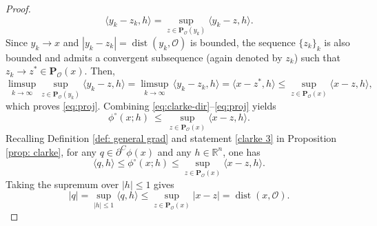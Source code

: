 \documentclass[12pt]{amsart}
\numberwithin{equation}{section}
\theoremstyle{plain}
\begin{document}
\begin{proof}
\begin{equation*}
    \langle y_k-z_k,h\rangle = \sup_{z\in \mathbf{P}_{\mathscr{O}}(y_k)}\langle y_k-z,h\rangle.
\end{equation*}
Since $y_k\to x$ and $ |y_k-z_k|=\operatorname{dist}(y_k,\mathscr{O})$ is bounded, the sequence $\{z_k\}_{k}$ is also bounded and admits a convergent subsequence (again denoted by $z_{k}$) such that $z_k\to z^*\in \mathbf{P}_{\mathscr{O}}(x)$. Then,
\begin{equation*}
    \limsup_{k\to\infty} \sup_{z\in \mathbf{P}_{\mathscr{O}}(y_k)}\langle y_k-z,h\rangle
    = \limsup_{k\to\infty} \, \langle y_k-z_k,h\rangle
    = \langle x-z^*,h\rangle
    \leq \sup_{z\in \mathbf{P}_{\mathscr{O}}(x)}\langle x-z,h\rangle,
\end{equation*}
which proves \eqref{eq:proj}. Combining \eqref{eq:clarke-dir}–\eqref{eq:proj} yields
\begin{equation*}
    \phi^{\circ}(x;h)\ \le\ \sup_{z\in \mathbf{P}_{\mathscr{O}}(x)}\langle x-z,h\rangle.
\end{equation*}
Recalling Definition \ref{def: general grad} and statement \ref{clarke 3} in Proposition \ref{prop: clarke}, 
for any $q\in\partial^C\phi(x)$ and any $h\in \mathbb{R}^{n}$, one has
\begin{equation*}
    \langle q,h\rangle \leq \phi^{\circ}(x;h) \leq \sup_{z\in \mathbf{P}_{\mathscr{O}}(x)}\langle x-z,h\rangle.
\end{equation*}
Taking the supremum over $|h|\leq 1$ gives
\begin{equation*}
    |q|=\sup_{|h|\leq 1}\langle q,h\rangle
    \leq \sup_{z\in \mathbf{P}_{\mathscr{O}}(x)}|x-z| = \operatorname{dist}(x,\mathscr{O}).
\end{equation*}


\end{proof}
\end{document}
